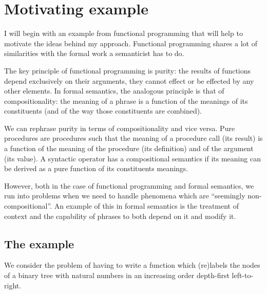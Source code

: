 \documentclass{article}
\begin{document}


\section{Motivating example}

I will begin with an example from functional programming that will help to
motivate the ideas behind my approach. Functional programming shares a lot of
similarities with the formal work a semanticist has to do.

The key principle of functional programming is purity: the results of
functions depend exclusively on their arguments, they cannot effect or be
effected by any other elements. In formal semantics, the analogous principle
is that of compositionality: the meaning of a phrase is a function of the
meanings of its constituents (and of the way those constituents are combined).

We can rephrase purity in terms of compositionality and vice versa. Pure
procedures are procedures such that the meaning of a procedure call (its
result) is a function of the meaning of the procedure (its definition) and of
the argument (its value). A syntactic operator has a compositional semantics
if its meaning can be derived as a pure function of its constituents meanings.

However, both in the case of functional programming and formal semantics, we
run into problems when we need to handle phenomena which are ``seemingly
non-compositional''. An example of this in formal semantics is the treatment
of context and the capability of phrases to both depend on it and modify it.

\subsection{The example}

We consider the problem of having to write a function which (re)labels the
nodes of a binary tree with natural numbers in an increasing order depth-first
left-to-right.
\end{document}

